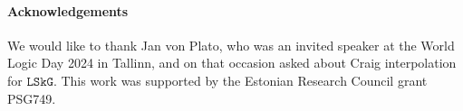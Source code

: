 \documentclass[submission,copyright,creativecommons]{eptcs}
\theoremstyle{definition}
\newcommand{\LSkG}{$\mathtt{LSkG}$}
\begin{document}
\paragraph{Acknowledgements} 
We would like to thank Jan von Plato, who was an invited speaker at the World Logic Day 2024 in Tallinn, and on that occasion asked about Craig interpolation for \LSkG.
This work was supported by the Estonian Research Council grant PSG749.



\end{document}
